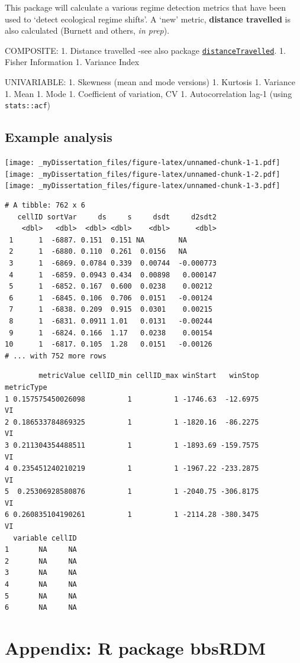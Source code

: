 \documentclass[12pt,twoside,openany]{reedthesis}
\begin{document}
This package will calculate a various regime detection metrics that have been used to `detect ecological regime shifts'. A `new' metric, \textbf{distance travelled} is also calculated (Burnett and others, \emph{in prep}).

COMPOSITE:
1. Distance travelled -see also package \href{https://github.com/TrashBirdEcology/distanceTravelled}{\texttt{distanceTravelled}}.
1. Fisher Information
1. Variance Index

UNIVARIABLE:
1. Skewness (mean and mode versions)
1. Kurtosis
1. Variance
1. Mean
1. Mode
1. Coefficient of variation, CV
1. Autocorrelation lag-1 (using \texttt{stats::acf})

\hypertarget{example-analysis}{%
\section{Example analysis}\label{example-analysis}}

\texttt{[image: \_myDissertation\_files/figure-latex/unnamed-chunk-1-1.pdf]} \texttt{[image: \_myDissertation\_files/figure-latex/unnamed-chunk-1-2.pdf]} \texttt{[image: \_myDissertation\_files/figure-latex/unnamed-chunk-1-3.pdf]}
\begin{verbatim}
# A tibble: 762 x 6
   cellID sortVar     ds     s     dsdt     d2sdt2
    <dbl>   <dbl>  <dbl> <dbl>    <dbl>      <dbl>
 1      1  -6887. 0.151  0.151 NA        NA       
 2      1  -6880. 0.110  0.261  0.0156   NA       
 3      1  -6869. 0.0784 0.339  0.00744  -0.000773
 4      1  -6859. 0.0943 0.434  0.00898   0.000147
 5      1  -6852. 0.167  0.600  0.0238    0.00212 
 6      1  -6845. 0.106  0.706  0.0151   -0.00124 
 7      1  -6838. 0.209  0.915  0.0301    0.00215 
 8      1  -6831. 0.0911 1.01   0.0131   -0.00244 
 9      1  -6824. 0.166  1.17   0.0238    0.00154 
10      1  -6817. 0.105  1.28   0.0151   -0.00126 
# ... with 752 more rows
\end{verbatim}
\begin{verbatim}
        metricValue cellID_min cellID_max winStart   winStop metricType
1 0.157575450026098          1          1 -1746.63  -12.6975         VI
2 0.186533784869325          1          1 -1820.16  -86.2275         VI
3 0.211304354488511          1          1 -1893.69 -159.7575         VI
4 0.235451240210219          1          1 -1967.22 -233.2875         VI
5  0.25306928580876          1          1 -2040.75 -306.8175         VI
6 0.260835104190261          1          1 -2114.28 -380.3475         VI
  variable cellID
1       NA     NA
2       NA     NA
3       NA     NA
4       NA     NA
5       NA     NA
6       NA     NA
\end{verbatim}
\hypertarget{bbsRDM}{%
\chapter*{Appendix: R package bbsRDM}\label{bbsRDM}}
\end{document}
